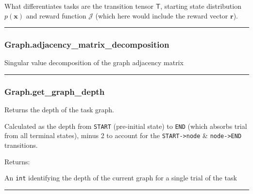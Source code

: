 What differentiates tasks are the transition tensor \(\mathsf T\),
starting state distribution \(p(\mathbf x)\) and reward function
\(\mathcal J\) (which here would include the reward vector
\(\mathbf r\)).

\begin{center}\rule{0.5\linewidth}{\linethickness}\end{center}

\subsubsection{Graph.adjacency\_matrix\_decomposition}\label{graph.adjacency_matrix_decomposition}

\begin{Shaded}
\begin{Highlighting}[]
\NormalTok{)}
\end{Highlighting}
\end{Shaded}

Singular value decomposition of the graph adjacency matrix

\begin{center}\rule{0.5\linewidth}{\linethickness}\end{center}

\subsubsection{Graph.get\_graph\_depth}\label{graph.get_graph_depth}

\begin{Shaded}
\begin{Highlighting}[]
\NormalTok{)}
\end{Highlighting}
\end{Shaded}

Returns the depth of the task graph.

Calculated as the depth from \texttt{START} (pre-initial state) to
\texttt{END} (which absorbs trial from all terminal states), minus 2 to
account for the \texttt{START-\textgreater{}node} \&
\texttt{node-\textgreater{}END} transitions.

Returns:

An \texttt{int} identifying the depth of the current graph for a single
trial of the task

\begin{center}\rule{0.5\linewidth}{\linethickness}\end{center}

